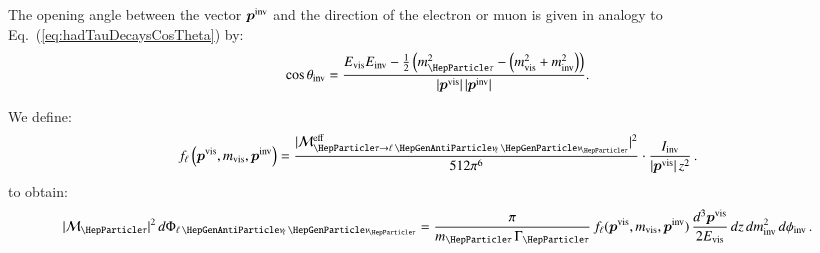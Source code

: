The opening angle between the vector $\bm{p^{\textrm{inv}}}$ and the direction
of the electron or muon is given in analogy to Eq.~(\ref{eq:hadTauDecaysCosTheta}) by:
\begin{equation}
\cos\theta_{\inv} = \frac{E_{\vis} E_{\inv} - \frac{1}{2} \left(m^{2}_{\Pgt} - \left( m^{2}_{\vis} + m^{2}_{\inv} \right) \right)}{\vert\bm{p^{\vis}}\vert \, 
  \vert\bm{p^{\inv}}\vert}.
\label{eq:lepTauDecaysCosTheta}
\end{equation}

We define:
\begin{equation}
f_{\Plepton}\left(\bm{p^{\vis}}, m_{\vis}, \bm{p^{\inv}}\right) = 
\frac{\vert\mathcal{M}^{\eff}_{\Pgt \to
  \ellnunu}\vert^{2}}{512\pi^{6}} \cdot 
    \frac{I_{\inv}}{\vert\bm{p^{\vis}}\vert \, z^{2}} \, .
\label{eq:lepTauDecays_f}
\end{equation}
to obtain:
\begin{equation}
\vert\mathcal{M}_{\Pgt}\vert^{2} \,
 d\Phi_{\ellnunu} = \frac{\pi}{m_{\Pgt} \, \Gamma_{\Pgt}} \,
 f_{\Plepton}(\bm{p^{\vis}}, m_{\vis}, \bm{p^{\inv}}) \, \frac{d^{3}\bm{p^{\vis}}}{2 E_{\vis}} \, dz \, dm^{2}_{\inv} \, d\phi_{\inv}
 \, .
\end{equation}
